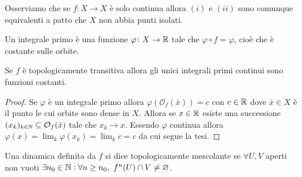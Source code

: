 Osserviamo che se $ f \colon X \to X $ è solo continua allora $ (i) $ e $ (ii) $ sono comunque equivalenti a patto che $ X $ non abbia punti isolati. \\

\begin{definition}
	Un integrale primo è una funzione $ \varphi \colon X \to \mathbb{R} $ tale che $ \varphi \circ f = \varphi $, cioè che è costante sulle orbite. 
\end{definition}

\begin{proposition}
	Se $ f $ è topologicamente transitiva allora gli unici integrali primi continui sono funzioni costanti.
\end{proposition}
%
\begin{proof}
	Se $ \varphi $ è un integrale primo allora $ \varphi(\mathcal{O}_f(\bar{x})) = c $ con $ c \in \mathbb{R} $ dove $ \bar{x} \in X $ è il punto le cui orbite sono dense in $ X $. Allora se $ x \in \mathbb{R} $ esiste una successione $ (x_k)_{k \in \mathbb{N}} \subseteq \mathcal{O}_f(\bar{x}) $ tale che $ x_k \to x $. Essendo $ \varphi $ continua allora $ \varphi(x) = \lim_{k} \varphi(x_k) = \lim_{k} c = c $ da cui segue la tesi. 
\end{proof}

\begin{definition}
	Una dinamica definita da $ f $ si dice topologicamente mescolante se $ \forall U, V $ aperti non vuoti $ \exists n_0 \in \mathbb{N} : \forall n \geq n_0, \ f^n(U) \cap V \neq \varnothing $. 
\end{definition}

